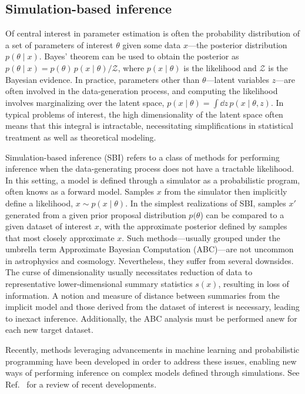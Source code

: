 \documentclass[prd,aps,10pt,nofootinbib,twocolumn,superscriptaddress,preprintnumbers,balancelastpage,longbibliography]{revtex4-1}
\begin{document}
\subsection{Simulation-based inference}

Of central interest in parameter estimation is often the probability distribution of a set of parameters of interest $\theta$ given some data $x$---the posterior distribution $p(\theta\mid x)$. Bayes' theorem can be used to obtain the posterior as $p(\theta\mid x) = p(\theta)\, p(x\mid\theta) / \mathcal Z$, where $p(x\mid\theta)$ is the likelihood and $\mathcal Z$ is the Bayesian evidence. In practice, parameters other than $\theta$---latent variables $z$---are often involved in the data-generation process, and computing the likelihood involves marginalizing over the latent space, $p(x\mid\theta) = \int \dd z\,p(x\mid\theta, z)$. In typical problems of interest, the high dimensionality of the latent space often means that this integral is intractable, necessitating simplifications in statistical treatment as well as theoretical modeling. 


Simulation-based inference (SBI) refers to a class of methods for performing inference when the data-generating process does not have a tractable likelihood. In this setting, a model is defined through a simulator as a probabilistic program, often knows as a forward model. Samples $x$ from the simulator then implicitly define a likelihood, $x\sim p(x\mid\theta)$. In the simplest realizations of SBI, samples $x'$ generated from a given prior proposal distribution $p(\theta$) can be compared to a given dataset of interest $x$, with the approximate posterior defined by samples that most closely approximate $x$. Such methods---usually grouped under the umbrella term Approximate Bayesian Computation (ABC)---are not uncommon in astrophysics and cosmology. Nevertheless, they suffer from several downsides. The curse of dimensionality usually necessitates reduction of data to representative lower-dimensional summary statistics $s(x)$, resulting in loss of information. A notion and measure of distance between summaries from the implicit model and those derived from the dataset of interest is necessary, leading to inexact inference. Additionally, the ABC analysis must be performed anew for each new target dataset.

Recently, methods leveraging advancements in machine learning and probabilistic programming have been developed in order to address these issues, enabling new ways of performing inference on complex models defined through simulations. See Ref.~\cite{cranmer2020frontier} for a review of recent developments.
\end{document}
